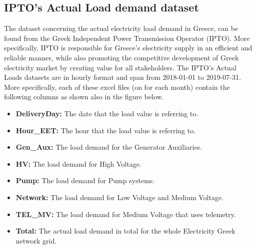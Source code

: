 \subsection{IPTO's Actual Load demand dataset}
The dataset concerning the actual electricity load demand in Greece, can be found from the Greek Independent Power Transmission Operator (IPTO). More specifically, IPTO is responsible for Greece’s electricity supply in an efficient and reliable manner, while also promoting the competitive development of Greek electricity market by creating value for all stakeholders. The IPTO’s Actual Loads datasets are in hourly format and span from 2018-01-01 to 2019-07-31. More specifically, each of these excel files (on for each month) contain the following columns as shown also in the figure below.
\begin{itemize}
    \item \textbf{DeliveryDay:} The date that the load value is referring to.
    \item \textbf{Hour\_EET:} The hour that the load value is referring to.
    \item \textbf{Gen\_Aux:} The load demand for the Generator Auxiliaries.
    \item \textbf{HV:} The load demand for High Voltage.
    \item \textbf{Pump:} The load demand for Pump systems.
    \item \textbf{Network:} The load demand for Low Voltage and Medium Voltage. 
    \item \textbf{TEL\_MV:} The load demand for Medium Voltage that uses telemetry.
    \item \textbf{Total:} The actual load demand in total for the whole Electricity Greek network grid.
\end{itemize}
